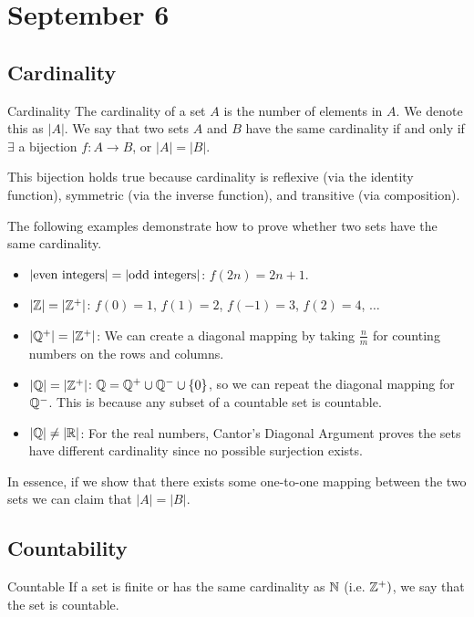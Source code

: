\section{September 6}

\subsection{Cardinality}
\begin{definition}{Cardinality}{}
    The cardinality of a set $A$ is the number of elements in $A$. We denote this as $|A|$. We say that two sets $A$ and $B$ have the same cardinality if and only if $\exists$ a bijection $f: A \rightarrow B$, or $|A| = |B|$.
\end{definition}
\begin{note}
    This bijection holds true because cardinality is reflexive (via the identity function), symmetric (via the inverse function), and transitive (via composition).
\end{note}

\begin{note}
    The following examples demonstrate how to prove whether two sets have the same cardinality.
\end{note}
\begin{itemize}
    \item $|\textnormal{even integers}| = |\textnormal{odd integers}|$: $f(2n) = 2n + 1$.
    \item $|\mathbb{Z}| = |\mathbb{Z}^+|$: $f(0) = 1$, $f(1) = 2$, $f(-1) = 3$, $f(2) = 4$, $\ldots$
    \item $|\mathbb{Q}^+| = |\mathbb{Z}^+|$: We can create a diagonal mapping by taking $\frac{n}{m}$ for counting numbers on the rows and columns.
    \item $|\mathbb{Q}| = |\mathbb{Z}^+|$: $\mathbb{Q} = \mathbb{Q}^+ \cup \mathbb{Q}^- \cup \{0\}$, so we can repeat the diagonal mapping for $\mathbb{Q}^-$. This is because any subset of a countable set is countable.
    \item $|\mathbb{Q}| \neq |\mathbb{R}|$: For the real numbers, Cantor's Diagonal Argument proves the sets have different cardinality since no possible surjection exists.
\end{itemize}
In essence, if we show that there exists some one-to-one mapping between the two sets we can claim that $|A| = |B|$.

\subsection{Countability}
\begin{definition}{Countable}{}
    If a set is finite or has the same cardinality as $\mathbb{N}$ (i.e. $\mathbb{Z}^+)$, we say that the set is countable.
\end{definition}

